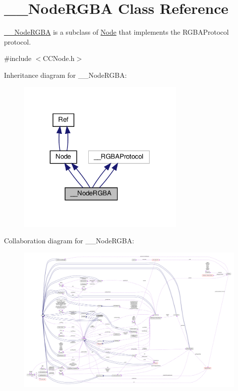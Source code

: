 \hypertarget{class____NodeRGBA}{}\section{\+\_\+\+\_\+\+Node\+R\+G\+BA Class Reference}
\label{class____NodeRGBA}


\hyperlink{class____NodeRGBA}{\+\_\+\+\_\+\+Node\+R\+G\+BA} is a subclass of \hyperlink{classNode}{Node} that implements the R\+G\+B\+A\+Protocol protocol.  




{\ttfamily \#include $<$C\+C\+Node.\+h$>$}



Inheritance diagram for \+\_\+\+\_\+\+Node\+R\+G\+BA\+:
\nopagebreak
\begin{figure}[H]
\begin{center}
\leavevmode
\includegraphics[width=230pt]{class____NodeRGBA__inherit__graph}
\end{center}
\end{figure}


Collaboration diagram for \+\_\+\+\_\+\+Node\+R\+G\+BA\+:
\nopagebreak
\begin{figure}[H]
\begin{center}
\leavevmode
\includegraphics[width=350pt]{class____NodeRGBA__coll__graph}
\end{center}
\end{figure}
